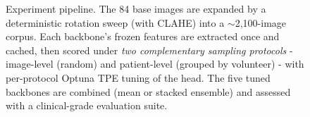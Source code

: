 \begin{figure}[htbp]
{}
\caption{Experiment pipeline. The 84 base images are expanded by a deterministic
rotation sweep (with CLAHE) into a $\sim$2{,}100-image corpus. Each backbone's
frozen features are extracted once and cached, then scored under \emph{two
complementary sampling protocols} - image-level (random) and patient-level
(grouped by volunteer) - with per-protocol Optuna TPE tuning of the head. The
five tuned backbones are combined (mean or stacked ensemble) and assessed with a
clinical-grade evaluation suite.}
\label{fig:pipeline}
\end{figure}
